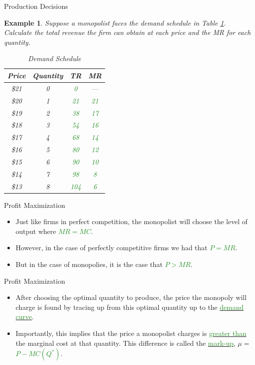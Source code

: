 \documentclass[xcolor={dvipsnames},pdf, hyperref={colorlinks=true, citecolor=ForestGreen, linkcolor=BlueViolet, urlcolor=Magenta}]{beamer}
\newtheorem{exmp}{Example}[section]
\newcommand{\ddp}[1]{{\textcolor{ForestGreen}{#1}}}
\newcommand{\dd}[1]{{\underline{\textcolor{ForestGreen}{#1}}}}
\begin{document}
\begin{frame}{Production Decisions}
	\begin{exmp} \scriptsize Suppose a monopolist faces the demand schedule in Table \ref{mono}. Calculate the total revenue the firm can obtain at each price and the MR for each quantity.
	
	\begin{table}[ht]
		\centering
		\caption{Demand Schedule}
		\label{mono}
		\begin{tabular}{ c|c|c|c}        
			
			Price & Quantity & TR & MR  \\
			\hline
			\$21 & 0 &  \ddp{0}&  \ddp{---} \\
			\$20 & 1 & \ddp{21}& \ddp{21}\\
			\$19 & 2 & \ddp{38}& \ddp{17}\\
			\$18 & 3 & \ddp{54}& \ddp{16}\\
			\$17 & 4 & \ddp{68}& \ddp{14}\\
			\$16 & 5 & \ddp{80}& \ddp{12}\\
			\$15 & 6 & \ddp{90}& \ddp{10}\\
			\$14 & 7 & \ddp{98}&  \ddp{8}\\
			\$13 & 8 & \ddp{104}&  \ddp{6}\\
		\end{tabular}
	\end{table}
\end{exmp} 
\end{frame}


\begin{frame}{Profit Maximization}
	\begin{itemize}
		\item Just like firms in perfect competition, the monopolist will choose the level of output where \dd{$MR = MC$}. 
		\item 	However, in the case of perfectly competitive firms we had that \dd{$P = MR$}. 
		\item But in the case of monopolies, it is the case that \dd{$P > MR$}. 
	\end{itemize}
\end{frame}

\begin{frame}{Profit Maximization}
	\begin{itemize}
		\item After choosing the optimal quantity to produce, the price the monopoly will charge is found by tracing up from this optimal quantity up to the \dd{demand curve}.
		\item Importantly, this implies that the price a monopolist charges is \dd{greater than} the marginal cost at that quantity. This difference is called the \dd{mark-up}, $\mu = $ \dd{$P - MC(Q^*)$}.
	\end{itemize}
\end{frame}
\end{document}
